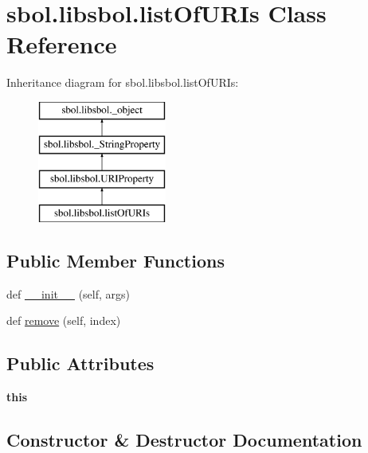 \hypertarget{classsbol_1_1libsbol_1_1list_of_u_r_is}{}\section{sbol.\+libsbol.\+list\+Of\+U\+R\+Is Class Reference}
\label{classsbol_1_1libsbol_1_1list_of_u_r_is}
Inheritance diagram for sbol.\+libsbol.\+list\+Of\+U\+R\+Is\+:\begin{figure}[H]
\begin{center}
\leavevmode
\includegraphics[height=4.000000cm]{classsbol_1_1libsbol_1_1list_of_u_r_is}
\end{center}
\end{figure}
\subsection*{Public Member Functions}
\begin{DoxyCompactItemize}
\item 
def \hyperlink{classsbol_1_1libsbol_1_1list_of_u_r_is_a9626dd3518333f683a3fcd84e9afffef}{\+\_\+\+\_\+init\+\_\+\+\_\+} (self, args)
\item 
def \hyperlink{classsbol_1_1libsbol_1_1list_of_u_r_is_ac413a59cfe08b95c62c8809ad75467dc}{remove} (self, index)
\end{DoxyCompactItemize}
\subsection*{Public Attributes}
\begin{DoxyCompactItemize}
\item 
{\bfseries this}\hypertarget{classsbol_1_1libsbol_1_1list_of_u_r_is_a9cb6b5694ea34e3b2da23da8ede10b3e}{}\label{classsbol_1_1libsbol_1_1list_of_u_r_is_a9cb6b5694ea34e3b2da23da8ede10b3e}

\end{DoxyCompactItemize}


\subsection{Constructor \& Destructor Documentation}
